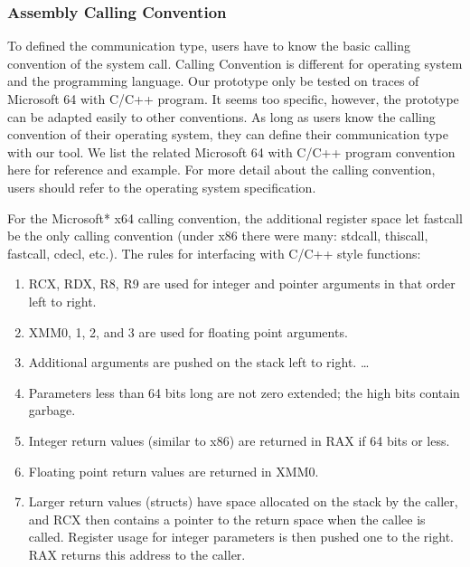 \documentclass[paper=a4, fontsize=11pt]{scrartcl}
\numberwithin{equation}{section}		%
\numberwithin{figure}{section}			%
\numberwithin{table}{section}				%
\begin{document}
\subsubsection{Assembly Calling Convention}
To defined the communication type, users have to know the basic calling convention of the system call. 
Calling Convention is different for operating system and the programming language. Our prototype only be tested on traces of Microsoft 64 with C/C++ program. It seems too specific, however, the prototype can be adapted easily to other conventions. As long as users know the calling convention of their operating system, they can define their communication type with our tool. We list the related Microsoft 64 with C/C++ program convention here for reference and example. For more detail about the calling convention, users should refer to the operating system specification.\par
For the Microsoft* x64 calling convention, the additional register space let fastcall be the only calling convention (under x86 there were many: stdcall, thiscall, fastcall, cdecl, etc.). The rules for interfacing with C/C++ style functions:\par
\begin{enumerate}  
\item RCX, RDX, R8, R9 are used for integer and pointer arguments in that order left to right.
\item XMM0, 1, 2, and 3 are used for floating point arguments.
\item Additional arguments are pushed on the stack left to right. \ldots 
\item Parameters less than 64 bits long are not zero extended; the high bits contain garbage.
\item Integer return values (similar to x86) are returned in RAX if 64 bits or less.
\item Floating point return values are returned in XMM0.
\item Larger return values (structs) have space allocated on the stack by the caller, and RCX then contains a pointer to the return space when the callee is called. Register usage for integer parameters is then pushed one to the right. RAX returns this address to the caller.
\end{enumerate}
\end{document}
